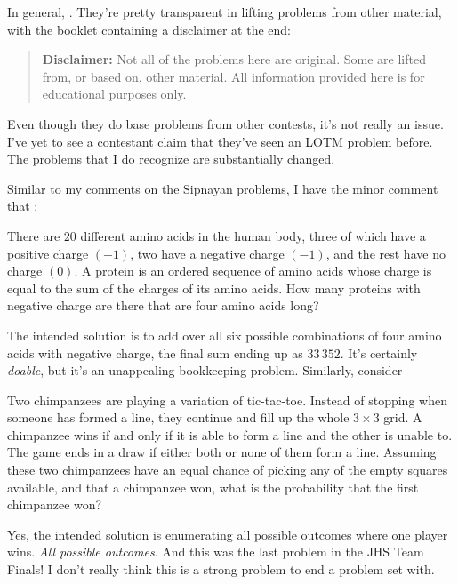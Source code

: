 \documentclass[11pt,paper=letter]{scrartcl}
\begin{document}
In general, . They're pretty transparent in lifting problems from other material, with the booklet containing a disclaimer at the end:

\begin{quote}
  \textbf{Disclaimer:} Not all of the problems here are original. Some are lifted from, or based on, other material. All information provided here is for educational purposes only.
\end{quote}

Even though they do base problems from other contests, it's not really an issue. I've yet to see a contestant claim that they've seen an LOTM problem before. The problems that I do recognize are substantially changed.

Similar to my comments on the Sipnayan problems, I have the minor comment that :

\begin{probboxed}
   There are $20$ different amino acids in the human body, three of which have a positive charge $(+1)$, two have a negative charge $(-1)$, and the rest have no charge $(0)$. A protein is an ordered sequence of amino acids whose charge is equal to the sum of the charges of its amino acids. How many proteins with negative charge are there that are four amino acids long?
\end{probboxed}

The intended solution is to add over all six possible combinations of four amino acids with negative charge, the final sum ending up as $33\,352$. It's certainly \emph{doable}, but it's an unappealing bookkeeping problem. Similarly, consider

\begin{probboxed}
   Two chimpanzees are playing a variation of tic-tac-toe. Instead of stopping when someone has formed a line, they continue and fill up the whole $3 \times 3$ grid. A chimpanzee wins if and only if it is able to form a line and the other is unable to. The game ends in a draw if either both or none of them form a line. Assuming these two chimpanzees have an equal chance of picking any of the empty squares available, and that a chimpanzee won, what is the probability that the first chimpanzee won?
\end{probboxed}

Yes, the intended solution is enumerating all possible outcomes where one player wins. \emph{All possible outcomes}. And this was the last problem in the JHS Team Finals! I don't really think this is a strong problem to end a problem set with.
\end{document}
